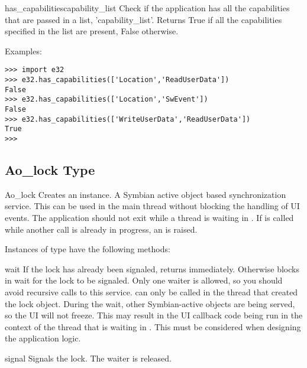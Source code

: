 \begin{funcdesc}{has_capabilities}{capability_list}
Check if the application has all the capabilities that are passed in a list, 
'capability_list'. Returns True if all the capabilities specified in the list are 
present, False otherwise.

Examples:

\begin{verbatim}
>>> import e32
>>> e32.has_capabilities(['Location','ReadUserData'])
False
>>> e32.has_capabilities(['Location','SwEvent'])
False
>>> e32.has_capabilities(['WriteUserData','ReadUserData'])
True
>>>
\end{verbatim}
\end{funcdesc}

\subsection{Ao_lock Type}
\label{subsec:Aolock}

\begin{classdesc}{Ao_lock}{}
Creates an  instance. A Symbian active object based 
synchronization service. This can be used in the main thread without 
blocking the handling of UI events. The application should not exit while a 
thread is waiting in . If  is called 
while another  call is already in progress, an  is raised.
\end{classdesc}

Instances of  type have the following methods:

\begin{methoddesc}[Ao_lock]{wait}{}
If the lock has already been signaled, returns immediately. Otherwise blocks 
in wait for the lock to be signaled. Only one waiter is allowed, so you 
should avoid recursive calls to this service.  can only be 
called in the thread that created the lock object. During the wait, other 
Symbian-active objects are being served, so the UI will not freeze. This may 
result in the UI callback code being run in the context of the thread that 
is waiting in . This must be considered when designing 
the application logic.
\end{methoddesc}

\begin{methoddesc}[Ao_lock]{signal}{}
Signals the lock. The waiter is released.
\end{methoddesc}

